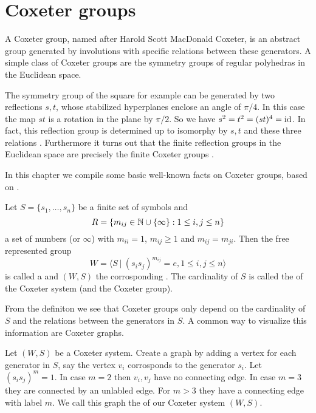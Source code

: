 \section{Coxeter groups}
\label{sec:coxeter-groups}

A Coxeter group, named after Harold Scott MacDonald Coxeter, is an abstract group generated by involutions with specific relations between these generators. A simple class of Coxeter groups are the symmetry groups of regular polyhedras in the Euclidean space.

The symmetry group of the square for example can be generated by two reflections $s,t$, whose stabilized hyperplanes enclose an angle of $\pi / 4$. In this case the map $st$ is a rotation in the plane by $\pi / 2$. So we have $s^2 = t^2 = (st)^4 = \operatorname{id}$. In fact, this reflection group is determined up to isomorphy by $s,t$ and these three relations \cite[Theorem 1.9]{humphreys:coxeter}. Furthermore it turns out that the finite reflection groups in the Euclidean space are precisely the finite Coxeter groups \cite[Theorem 6.4]{humphreys:coxeter}.

In this chapter we compile some basic well-known facts on Coxeter groups, based on \cite{humphreys:coxeter}.

\begin{defi}
	Let $S = \{ s_1, \ldots, s_n \}$ be a finite set of symbols and
	$$R = \{ m_{ij} \in \mathbb{N} \cup \{\infty\} : 1 \leq i,j \leq n \}$$
	a set of numbers (or $\infty$) with $m_{ii} = 1$, $m_{ij} \geq 1$ and $m_{ij} = m_{ji}$. Then the free represented group
	$$W = \langle S \ | \ (s_i s_j)^{m_{ij}} = e, 1 \leq i,j \leq n \rangle$$
	is called a  and $(W,S)$ the corrosponding . The cardinality of $S$ is called the  of the Coxeter system (and the Coxeter group).
\end{defi}

From the definiton we see that Coxeter groups only depend on the cardinality of $S$ and the relations between the generators in $S$. A common way to visualize this information are Coxeter graphs.

\begin{defi}
	Let $(W,S)$ be a Coxeter system. Create a graph by adding a vertex for each generator in $S$, say the vertex $v_i$ corrosponds to the generator $s_i$. Let $(s_i s_j)^m = 1$. In case $m = 2$ then $v_i,v_j$ have no connecting edge. In case $m = 3$ they are connected by an unlabled edge. For $m > 3$ they have a connecting edge with label $m$. We call this graph the  of our Coxeter system $(W,S)$.
\end{defi}

